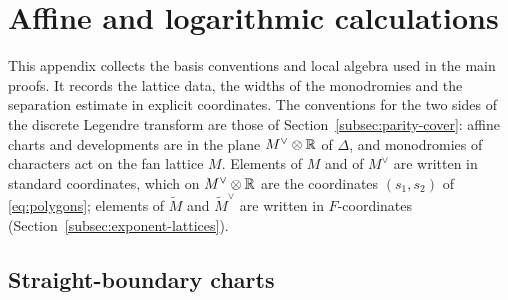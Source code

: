 \section{Affine and logarithmic calculations}
\label{app:calculations}

This appendix collects the basis conventions and local algebra used in the
main proofs.  It records the lattice data, the widths of the monodromies
and the separation estimate in explicit coordinates.  The conventions for
the two sides of the discrete Legendre transform are those of
Section~\ref{subsec:parity-cover}: affine charts and developments are in the plane
$M^\vee\otimes\mathbb R$ of $\Delta$, and monodromies of characters act on the fan
lattice $M$.  Elements of $M$ and of $M^\vee$ are written in standard
coordinates, which on $M^\vee\otimes\mathbb R$ are the coordinates $(s_1,s_2)$ of
\eqref{eq:polygons}; elements of $\widetilde M$ and $\widetilde M^\vee$ are
written in $F$-coordinates (Section~\ref{subsec:exponent-lattices}).

\subsection{Straight-boundary charts}


